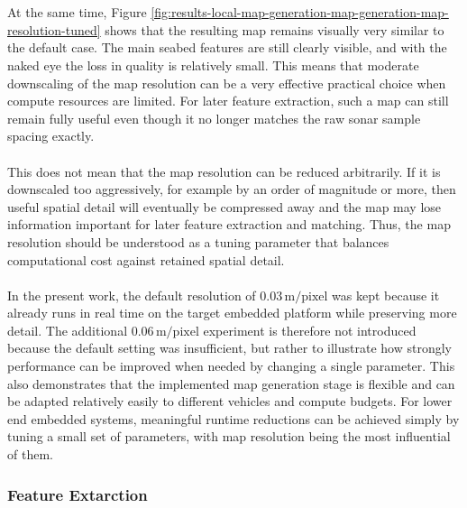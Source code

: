 \\ \\
At the same time, Figure \ref{fig:results-local-map-generation-map-generation-map-resolution-tuned} shows that the resulting map remains visually very similar to the default case. The main seabed features are still clearly visible, and with the naked eye the loss in quality is relatively small. This means that moderate downscaling of the map resolution can be a very effective practical choice when compute resources are limited. For later feature extraction, such a map can still remain fully useful even though it no longer matches the raw sonar sample spacing exactly.
\\ \\
This does not mean that the map resolution can be reduced arbitrarily. If it is downscaled too aggressively, for example by an order of magnitude or more, then useful spatial detail will eventually be compressed away and the map may lose information important for later feature extraction and matching. Thus, the map resolution should be understood as a tuning parameter that balances computational cost against retained spatial detail.
\\ \\
In the present work, the default resolution of $0.03\,\mathrm{m/pixel}$ was kept because it already runs in real time on the target embedded platform while preserving more detail. The additional $0.06\,\mathrm{m/pixel}$ experiment is therefore not introduced because the default setting was insufficient, but rather to illustrate how strongly performance can be improved when needed by changing a single parameter. This also demonstrates that the implemented map generation stage is flexible and can be adapted relatively easily to different vehicles and compute budgets. For lower end embedded systems, meaningful runtime reductions can be achieved simply by tuning a small set of parameters, with map resolution being the most influential of them.



\newpage



\subsubsection{Feature Extarction}

